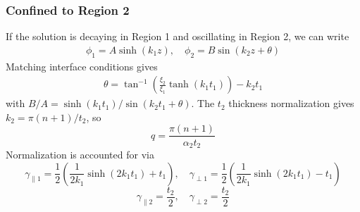 \documentclass{article}
\begin{document}
\subsubsection{Confined to Region 2}
If the solution is decaying in Region 1 and oscillating in Region 2, we can write
\begin{align}
  \phi_1=A\sinh(k_1 z), \quad \phi_2=B\sin(k_2 z+\theta)
\end{align}
Matching interface conditions gives
\begin{align}
  \theta=\tan^{-1}\left( \frac{\xi_2}{\xi_1}\tanh(k_1t_1) \right)-k_2t_1
\end{align}
with $B/A=\sinh(k_1t_1)/\sin(k_2t_1+\theta)$.  The $t_2$ thickness normalization gives $k_2=\pi (n+1)/t_2$, so
\begin{equation}
  q=\frac{\pi(n+1)}{\alpha_2t_2}
\end{equation}
Normalization is accounted for via
\begin{equation}
  \gamma_{\parallel 1}=\frac{1}{2}\left(\frac{1}{2k_1}\sinh(2k_1t_1)+t_1\right), \quad 
  \gamma_{\perp     1}=\frac{1}{2}\left(\frac{1}{2k_1}\sinh(2k_1t_1)-t_1\right)
\end{equation}
\begin{equation}
  \gamma_{\parallel 2}=\frac{t_2}{2}, \quad
  \gamma_{\perp     2}=\frac{t_2}{2}
\end{equation}
\end{document}
